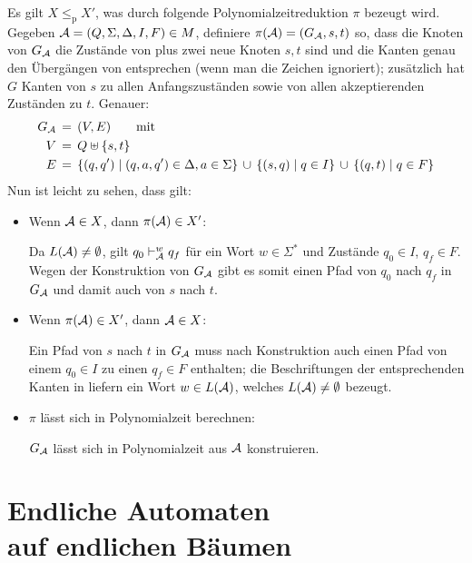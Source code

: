 \documentclass[fontsize=11pt, twoside=false, numbers=autoenddot]{scrbook}
\begin{document}
Es gilt $X \leq_{\text{p}} X'$, was durch folgende Polynomialzeitreduktion $\pi$ bezeugt wird.
Gegeben $\mathcal{A} = (Q,\Sigma,\Delta,I,F) \in M$, definiere $\pi(\mathcal{A}) = (G_\mathcal{A},s,t)$ so, dass
die Knoten von $G_\mathcal{A}$ die Zustände von \Amc plus zwei neue Knoten $s,t$ sind
und die Kanten genau den Übergängen von \Amc entsprechen (wenn man die Zeichen ignoriert);
zusätzlich hat $G$ Kanten von $s$ zu allen Anfangszuständen sowie von allen akzeptierenden Zuständen
zu $t$. Genauer:
%
\begin{align*}
  G_\mathcal{A} & \,=\, (V,E)\qquad\text{mit} \\
  V      & \,=\, Q \uplus \{s,t\} \\
  E      & \,=\, \{(q,q') \mid (q,a,q') \in \Delta, a \in \Sigma\} \,\cup\, \{(s,q) \mid q \in I\} \,\cup\, \{(q,t) \mid q \in F\}
\end{align*}
%
Nun ist leicht zu sehen, dass gilt:
%
\begin{itemize}
  \item
    Wenn $\mathcal{A} \in X$, dann $\pi(\mathcal{A}) \in X'$:
    \par
    Da $L(\mathcal{A}) \neq \emptyset$, gilt $q_0 \vdash_\mathcal{A}^w q_f$ für ein Wort $w \in \Sigma^*$
    und Zustände $q_0 \in I$, $q_f \in F$. Wegen der Konstruktion von $G_\mathcal{A}$
    gibt es somit einen Pfad von $q_0$ nach $q_f$ in $G_\mathcal{A}$ und damit auch von $s$ nach $t$.
  \item
    Wenn $\pi(\mathcal{A}) \in X'$, dann $\mathcal{A} \in X$:
    \par
    Ein Pfad von $s$ nach $t$ in $G_\mathcal{A}$ muss nach Konstruktion auch einen Pfad von einem
    $q_0 \in I$ zu einen $q_f \in F$ enthalten; die Beschriftungen der entsprechenden Kanten in \Amc
    liefern ein Wort $w \in L(\mathcal{A})$, welches $L(\mathcal{A}) \neq \emptyset$ bezeugt.
  \item
    $\pi$ lässt sich in Polynomialzeit berechnen:
    \par
    $G_\mathcal{A}$ lässt sich in Polynomialzeit aus $\mathcal{A}$ konstruieren.
\end{itemize}

\part[Endliche Automaten auf endlichen Bäumen]{Endliche Automaten \\ auf endlichen Bäumen}
\end{document}
